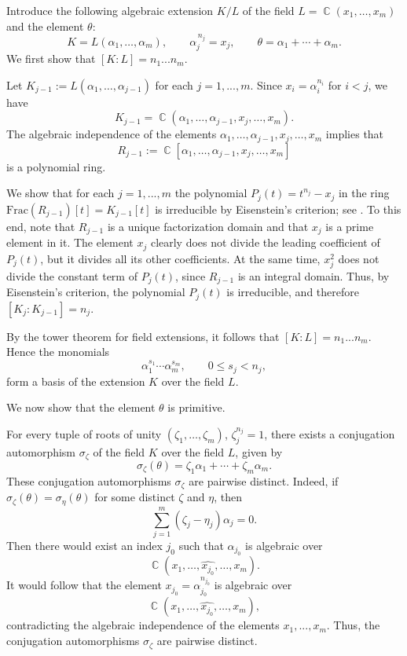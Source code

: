 \documentclass[14pt, dvipsnames]{extarticle}
\makeatletter
\theoremstyle{plain}
\theoremstyle{definition}
\theoremstyle{remark}
\renewenvironment{proof}[1][\proofname]{
  \par\pushQED{\qed}\normalfont
  \topsep6\p@\@plus6\p@\relax
  \trivlist\item[\hskip\labelsep\bfseries\itshape #1\@addpunct{.}]
}{\popQED\endtrivlist\@endpefalse}
\DeclareMathOperator{\Cc}{\mathbb{C}}
\makeatother
\begin{document}
\begin{proof}
Introduce the following algebraic extension $K/L$ of the field $L=\Cc(x_1,\dots,x_m)$ and the element $\theta$:
$$
K=L(\alpha_1,\dots,\alpha_m),
\qquad
\alpha_j^{\,n_j}=x_j,
\qquad
\theta=\alpha_1+\cdots+\alpha_m.
$$
We first show that $[K:L]=n_1... n_m$. 

Let $K_{j-1}:=L(\alpha_1,\dots,\alpha_{j-1})$ for each $j = 1, ..., m$. Since $x_i=\alpha_i^{n_i}$ for $i<j$, we have
$$K_{j-1}=\Cc(\alpha_1,\dots,\alpha_{j-1},x_j,\dots,x_m).$$
The algebraic independence of the elements $\alpha_1,\dots,\alpha_{j-1},x_j,\dots,x_m$ implies that
$$R_{j-1}:=\Cc[\alpha_1,\dots,\alpha_{j-1},x_j,\dots,x_m]$$
is a polynomial ring. 

We show that for each $j = 1, ..., m$ the polynomial $P_j(t) = t^{n_j}-x_j$ in the ring $\mathrm{Frac}(R_{j-1})[t] = K_{j-1}[t]$ is irreducible by Eisenstein's criterion; see \cite[Chapter V, \S 7]{Lang}. To this end, note that $R_{j-1}$ is a unique factorization domain and that $x_j$ is a prime element in it. The element $x_j$ clearly does not divide the leading coefficient of $P_j(t)$, but it divides all its other coefficients. At the same time, $x_j^2$ does not divide the constant term of $P_j(t)$, since $R_{j-1}$ is an integral domain. Thus, by Eisenstein's criterion, the polynomial $P_j(t)$ is irreducible, and therefore $[K_j:K_{j-1}] = n_j$. 

By the tower theorem for field extensions, it follows that $[K:L] = n_1...n_m$. Hence the monomials
$$\alpha_1^{s_1}\cdots \alpha_m^{s_m},\qquad 0\le s_j<n_j,$$
form a basis of the extension $K$ over the field $L$.    

We now show that the element $\theta$ is primitive. 

For every tuple of roots of unity $(\zeta_1,\dots,\zeta_m)$, $\zeta_j^{n_j}=1$, there exists a conjugation automorphism $\sigma_{\zeta}$ of the field $K$ over the field $L$, given by
$$\sigma_{\zeta}(\theta)=\zeta_1\alpha_1+\cdots+\zeta_m\alpha_m.$$
These conjugation automorphisms $\sigma_\zeta$ are pairwise distinct. Indeed, if $\sigma_{\zeta}(\theta)=\sigma_{\eta}(\theta)$ for some distinct $\zeta$ and $\eta$, then
$$\sum_{j=1}^m (\zeta_j-\eta_j)\alpha_j=0.$$
Then there would exist an index $j_0$ such that $\alpha_{j_0}$ is algebraic over
$$\Cc(x_1,\dots,\widehat{x_{j_0}},\dots,x_m).$$
It would follow that the element $x_{j_0}=\alpha_{j_0}^{n_{j_0}}$ is algebraic over
$$\Cc(x_1,\dots,\widehat{x_{j_0}},\dots,x_m),$$
contradicting the algebraic independence of the elements $x_1, ..., x_m$. Thus, the conjugation automorphisms $\sigma_\zeta$ are pairwise distinct.


\end{proof}
\end{document}
